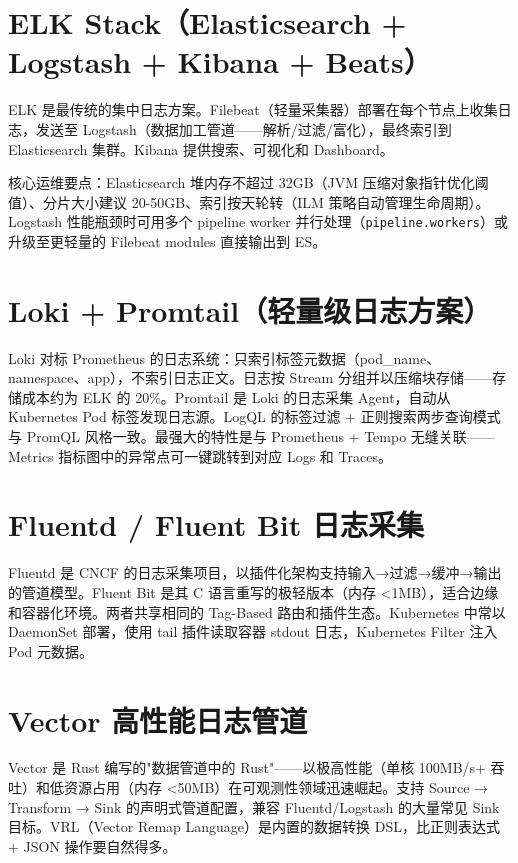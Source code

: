 \documentclass[12pt,UTF8]{ctexbook}
\begin{document}
  \section{ELK Stack（Elasticsearch + Logstash + Kibana + Beats）}

ELK 是最传统的集中日志方案。Filebeat（轻量采集器）部署在每个节点上收集日志，发送至 Logstash（数据加工管道——解析/过滤/富化），最终索引到 Elasticsearch 集群。Kibana 提供搜索、可视化和 Dashboard。

核心运维要点：Elasticsearch 堆内存不超过 32GB（JVM 压缩对象指针优化阈值）、分片大小建议 20-50GB、索引按天轮转（ILM 策略自动管理生命周期）。Logstash 性能瓶颈时可用多个 pipeline worker 并行处理（\texttt{pipeline.workers}）或升级至更轻量的 Filebeat modules 直接输出到 ES。

  \section{Loki + Promtail（轻量级日志方案）}

Loki 对标 Prometheus 的日志系统：只索引标签元数据（pod\_name、namespace、app），不索引日志正文。日志按 Stream 分组并以压缩块存储——存储成本约为 ELK 的 20\%。Promtail 是 Loki 的日志采集 Agent，自动从 Kubernetes Pod 标签发现日志源。LogQL 的标签过滤 + 正则搜索两步查询模式与 PromQL 风格一致。最强大的特性是与 Prometheus + Tempo 无缝关联——Metrics 指标图中的异常点可一键跳转到对应 Logs 和 Traces。

  \section{Fluentd / Fluent Bit 日志采集}

Fluentd 是 CNCF 的日志采集项目，以插件化架构支持输入→过滤→缓冲→输出的管道模型。Fluent Bit 是其 C 语言重写的极轻版本（内存 <1MB），适合边缘和容器化环境。两者共享相同的 Tag-Based 路由和插件生态。Kubernetes 中常以 DaemonSet 部署，使用 tail 插件读取容器 stdout 日志，Kubernetes Filter 注入 Pod 元数据。

  \section{Vector 高性能日志管道}

Vector 是 Rust 编写的"数据管道中的 Rust"——以极高性能（单核 100MB/s+ 吞吐）和低资源占用（内存 <50MB）在可观测性领域迅速崛起。支持 Source → Transform → Sink 的声明式管道配置，兼容 Fluentd/Logstash 的大量常见 Sink 目标。VRL（Vector Remap Language）是内置的数据转换 DSL，比正则表达式 + JSON 操作要自然得多。
\end{document}
